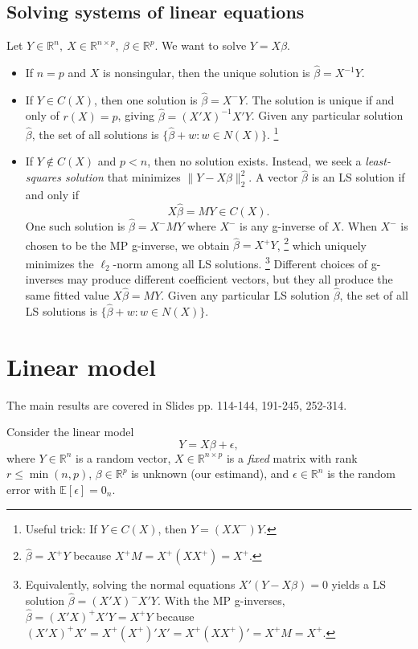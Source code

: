 \documentclass{article}
\theoremstyle{break}
\newcommand{\R}{\ensuremath{\mathbb{R}}}
\newcommand{\E}{\ensuremath{\mathbb{E}}}
\begin{document}
\subsection{Solving systems of linear equations}\label{sec:prelim-lm-solve-linear-system}
Let $Y \in \R^n,\ X \in \R^{n \times p},\ \beta \in \R^p$. We want to solve 
$Y = X\beta$.
\begin{itemize}
    \item If $n=p$ and $X$ is nonsingular, then the unique solution is $\hat\beta = X^{-1}Y$.
    \item If $Y\in C(X)$, then one solution is $\hat\beta = X^- Y$. 
    The solution is unique if and only of $r(X) = p$, giving $\hat\beta = (X'X)^{-1}X'Y$. 
    Given any particular solution $\hat\beta$, the set of all solutions is $\{\hat\beta + w: w \in N(X)\}$.
    \footnote{Useful trick: If $Y \in C(X)$, then $Y = (XX^-)Y$.}
    \item If $Y\notin C(X)$ and $p < n$, then no solution exists. 
    Instead, we seek a \emph{least-squares solution} that minimizes $\|Y-X\beta\|_2^2$. A vector $\hat\beta$ is an LS solution if and only if
    \[
    X\hat\beta=MY\in C(X).
    \]
    One such solution is $\hat\beta = X^- MY$ where $X^-$ is any g-inverse of $X$.
    When $X^-$ is chosen to be the MP g-inverse, we obtain $\hat\beta=X^+Y$, 
    \footnote{
        $\hat\beta=X^+Y$  because $X^+ M = X^+(X X^+) = X^+$.}
    which uniquely minimizes the $\ell_2$-norm among all LS solutions.
    \footnote{
        Equivalently, solving the normal equations $X'(Y-X\beta)=0$ yields a LS solution $\hat\beta=(X'X)^-X'Y$. With the MP g-inverses, $\hat\beta = (X'X)^+ X'Y = X^+Y$ because $(X'X)^+ X' = X^+ (X^+)' X' = X^+ (XX^+)' = X^+ M = X^+$.}
    Different choices of g-inverses may produce different coefficient vectors, but they all produce the same fitted value $X\hat\beta=MY$. Given any particular LS solution $\hat\beta$, the set of all LS solutions is $\{\hat\beta+w:w\in N(X)\}$.
\end{itemize}



\section{Linear model}\label{sec:lm}
The main results are covered in Slides pp. 114-144, 191-245, 252-314.

Consider the linear model
\begin{equation}\label{eq:lm}
    Y = X\beta + \epsilon,
\end{equation}
where $Y\in \R^n$ is a random vector, $X \in \R^{n \times p}$ is a \emph{fixed} matrix with rank $r \leq \min(n,p)$, $\beta \in \R^p$ is unknown (our estimand), and $\epsilon \in \R^n$ is the random error with $\E[\epsilon] = 0_n$.
\end{document}
